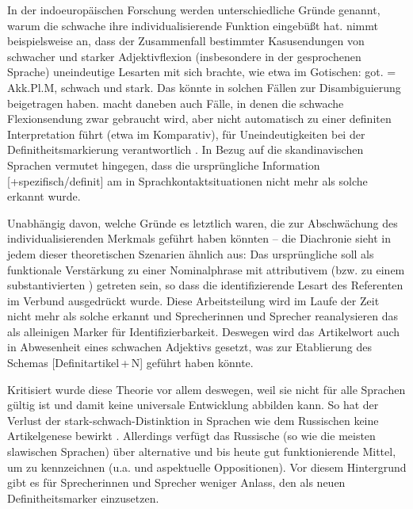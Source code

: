 In der indoeuropäischen Forschung werden unterschiedliche Gründe genannt, warum die schwache  ihre individualisierende Funktion eingebüßt hat. \textcite[24]{Kovari1984} nimmt beispielsweise an, dass der Zusammenfall bestimmter Kasusendungen  von schwacher und starker Adjektivflexion (insbesondere in der gesprochenen Sprache) uneindeutige Lesarten mit sich brachte, wie etwa im Gotischen: got.  = Akk.Pl.M, schwach und stark. Das  könnte in solchen Fällen zur Disambiguierung beigetragen haben.
\textcite[44]{Ebert1978} macht daneben \parencite[mit Verweis auf][]{Kuhn1955} auch Fälle, in denen die schwache Flexionsendung zwar gebraucht wird, aber nicht automatisch zu einer definiten Interpretation führt (etwa im Komparativ), für Uneindeutigkeiten bei der Definitheitsmarkierung  verantwortlich \parencite[vgl. zu dieser Argumentation auch][25]{Kovari1984}. In Bezug auf die skandinavischen Sprachen vermutet \textcite{Braunmuller2013} hingegen, dass die ursprüngliche Information [+spezifisch/definit] am  in Sprachkontaktsituationen nicht mehr als solche erkannt wurde. 

Unabhängig davon, welche Gründe es letztlich waren, die zur Abschwächung des individualisierenden Merkmals geführt haben könnten -- die Diachronie sieht in jedem dieser theoretischen Szenarien ähnlich aus: Das ursprüngliche  soll als funktionale Verstärkung zu einer Nominalphrase  mit attributivem  (bzw. zu einem substantivierten  ) getreten sein, so dass die identifizierende Lesart des Referenten im Verbund ausgedrückt wurde. Diese Arbeitsteilung wird im Laufe der Zeit nicht mehr als solche erkannt und Sprecherinnen und Sprecher reanalysieren  das  als alleinigen Marker für Identifizierbarkeit. Deswegen wird das Artikelwort auch in Abwesenheit eines schwachen Adjektivs gesetzt, was zur Etablierung des Schemas  [Definitartikel\,+\,N]  geführt haben könnte.     

Kritisiert wurde diese Theorie vor allem deswegen, weil sie nicht für alle Sprachen gültig ist und damit keine universale Entwicklung abbilden kann. So hat der Verlust der stark-schwach-Distinktion in Sprachen wie dem Russischen keine Artikelgenese bewirkt \parencite[][64]{Philippi1997}. Allerdings verfügt das Russische (so wie die meisten slawischen Sprachen) über alternative und bis heute gut funktionierende Mittel, um  zu kennzeichnen (u.a.  und aspektuelle  Oppositionen). Vor diesem Hintergrund gibt es für Sprecherinnen und Sprecher weniger Anlass,  den  als neuen Definitheitsmarker  einzusetzen.

